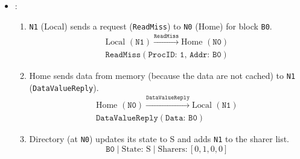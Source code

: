 \begin{itemize}
    \item {}:
    \begin{enumerate}
        \item \texttt{N1} (Local) sends a request (\texttt{ReadMiss}) to \texttt{N0} (Home) for block \texttt{B0}.
        \begin{gather*}
            \text{Local } (\texttt{N1}) \xrightarrow{\texttt{ReadMiss}} \text{Home } (\texttt{N0}) \\[.3em]
            \texttt{ReadMiss}(\texttt{ProcID: 1, Addr: B0})
        \end{gather*}

        \item Home sends data from memory (because the data are not cached) to \texttt{N1} (\texttt{DataValueReply}).
        \begin{gather*}
            \text{Home } (\texttt{N0}) \xrightarrow{\texttt{DataValueReply}} \text{Local } (\texttt{N1})
            \\[.3em]
            \texttt{DataValueReply}(\texttt{Data: B0})
        \end{gather*}

        \item Directory (at \texttt{N0}) updates its state to S and adds \texttt{N1} to the sharer list.
        \begin{equation*}
            \texttt{B0} \; | \; \text{State: S} \; | \; \text{Sharers:} \, \left[0, 1, 0, 0\right]
        \end{equation*}
    \end{enumerate}
    \begin{figure}[!htp]
        \centering
\end{figure}
\end{itemize}

